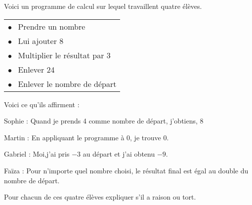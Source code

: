 
\medskip

Voici un programme de calcul sur lequel travaillent quatre élèves.

\begin{center}
\begin{tabularx}{0.4\linewidth}{|X|}\hline
$\bullet~~$ Prendre un nombre\\
$\bullet~~$ Lui ajouter 8\\
$\bullet~~$ Multiplier le résultat par 3\\
$\bullet~~$ Enlever 24\\
$\bullet~~$ Enlever le nombre de départ\\\hline
\end{tabularx}
\end{center}

Voici ce qu'ils affirment :

Sophie : \og Quand je prends 4 comme nombre de
départ, j'obtiens, 8 \fg

Martin : \og En appliquant le programme à 0, je trouve 0. \fg

Gabriel : \og  Moi,j'ai pris $-3$ au départ et j'ai obtenu $-9$. \fg

Faïza : \og Pour n'importe quel nombre choisi, le résultat final est égal au double du nombre de départ. \fg

Pour chacun de ces quatre élèves expliquer s'il a raison ou tort.

\clearpage

